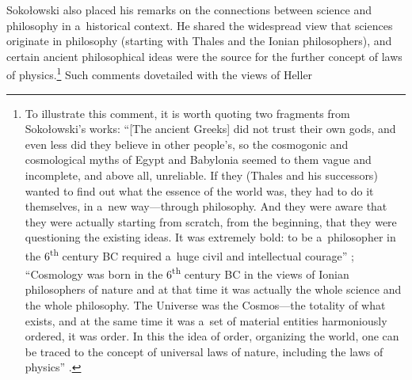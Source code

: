 \documentclass[%
  manuscript=article,
  year=2024,
  volume=77,
  doi=00000.000,
]{zfn}
\begin{document}
Sokołowski also placed his remarks on the connections between science and philosophy in a~historical context. He shared the widespread view that sciences originate in philosophy (starting with Thales and the Ionian philosophers), and certain ancient philosophical ideas were the source for the further concept of laws of physics.\footnote{To illustrate this comment, it is worth quoting two fragments from Sokołowski's works:
``[The ancient Greeks] did not trust their own gods, and even less did they believe in other people's, so the cosmogonic and cosmological myths of Egypt and Babylonia seemed to them vague and incomplete, and above all, unreliable. If they (Thales and his successors) wanted to find out what the essence of the world was, they had to do it themselves, in a~new way---through philosophy. And they were aware that they were actually starting from scratch, from the beginning, that they were questioning the existing ideas. It was extremely bold: to be a~philosopher in the 6\textsuperscript{th} century BC required a~huge civil and intellectual courage''
\parencite[][p.44]{Sokoowski1989Gos}; %
``Cosmology was born in the 6\textsuperscript{th} century BC in the views of Ionian philosophers of nature and at that time it was actually the whole science and the whole philosophy. The Universe was the Cosmos---the totality of what exists, and at the same time it was a~set of material entities harmoniously ordered, it was order. In this the idea of order, organizing the world, one can be traced to the concept of universal laws of nature, including the laws of physics''
\parencite[][p.28]{Sokoowski2015Granice}.%
} Such comments dovetailed with the views of Heller 
\end{document}
